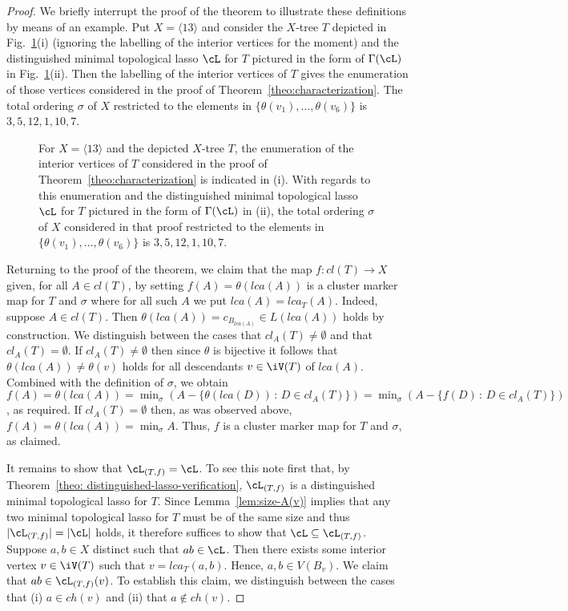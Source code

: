 \begin{proof}
We briefly interrupt the proof of the theorem to illustrate these definitions
by means of an example. Put $X=\langle 13\rangle$ and consider the $X$-tree
$T$ depicted in Fig.~\ref{fig:illustration-main-theorem}(i) (ignoring the
labelling of the interior vertices for the moment) and the distinguished
minimal topological lasso $\cL$ for $T$ pictured in the form of $\Gamma(\cL)$
in Fig.~\ref{fig:illustration-main-theorem}(ii). Then the labelling of the
interior vertices of $T$ gives the enumeration of those vertices considered in
the proof of Theorem~\ref{theo:characterization}. The total ordering $\sigma$
of $X$ restricted to the elements in $\{\theta(v_1),\ldots, \theta(v_6)\}$ is
$3,5,12,1,10,7$.
%
\begin{figure}[h]
  \begin{center}
    
  \end{center}
  \caption{ For $X=\langle 13\rangle$ and the depicted $X$-tree $T$, the
    enumeration of the interior vertices of $T$ considered in the proof of
    Theorem~\ref{theo:characterization} is indicated in (i). With regards to
    this enumeration and the distinguished minimal topological lasso $\cL$ for
    $T$ pictured in the form of $\Gamma(\cL)$ in (ii), the total ordering
    $\sigma$ of $X$ considered in that proof restricted to the elements in
    $\{\theta(v_1),\ldots, \theta(v_6)\}$ is $3,5,12,1,10,7$.}
  \label{fig:illustration-main-theorem}
\end{figure}

Returning to the proof of the theorem, we claim that the map $f:cl(T)\to X$
given, for all $A\in cl(T)$, by setting $f(A)=\theta(lca(A))$ is a cluster
marker map for $T$ and $\sigma$ where for all such $A$ we put
$lca(A)=lca_T(A)$. Indeed, suppose $A\in cl(T)$.  Then
$\theta(lca(A))=c_{B_{lca(A)}}\in L(lca(A))$ holds by construction.  We
distinguish between the cases that $cl_A(T)\not =\emptyset$ and that
$cl_A(T)=\emptyset$. If $cl_A(T)\not =\emptyset$ then since $\theta$ is
bijective it follows that $\theta(lca(A))\not=\theta(v)$ holds for all
descendants $v\in \iV(T)$ of $lca(A)$.  Combined with the definition of
$\sigma$, we obtain $f(A)=\theta(lca(A))=\min_{\sigma}(A-\{\theta(lca(D))\,:\,
D\in cl_A(T)\})= \min_{\sigma}(A-\{f(D)\,:\, D\in cl_A(T)\})$, as required.
If $cl_A(T)=\emptyset$ then, as was observed above,
$f(A)=\theta(lca(A))=\min_{\sigma}A$. Thus, $f$ is a cluster marker map for
$T$ and $\sigma$, as claimed.

It remains to show that $\cL_{(T,f)}=\cL$. To see this note first that, by
Theorem~\ref{theo: distinguished-lasso-verification}, $\cL_{(T,f)}$ is a
distinguished minimal topological lasso for $T$. Since
Lemma~\ref{lem:size-A(v)} implies that any two minimal topological lasso for
$T$ must be of the same size and thus $|\cL_{(T,f)}|=|\cL|$ holds, it
therefore suffices to show that $\cL\subseteq \cL_{(T,f)}$. Suppose $a,b\in X$
distinct such that $ab\in \cL$.  Then there exists some interior vertex $v\in
\iV(T)$ such that $v=lca_T(a,b)$.  Hence, $a,b\in V(B_v)$. We claim that
$ab\in \cL_{(T,f)}(v)$.  To establish this claim, we distinguish between the
cases that (i) $a\in ch(v)$ and (ii) that $a\not\in ch(v)$.


\end{proof}
